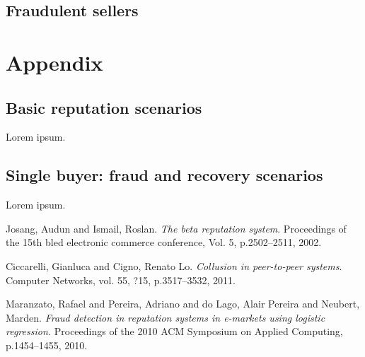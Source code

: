 \documentclass[11pt]{article}
\begin{document}
\subsection{Fraudulent sellers}

\section{Appendix} \label{appendix}

\subsection{Basic reputation scenarios} \label{appendix:basicReputation}

Lorem ipsum.

\subsection{Single buyer: fraud and recovery scenarios} \label{appendix:fraudAndRecovery}

Lorem ipsum.


\newpage

\begin{thebibliography}{1}
 
Josang, Audun and Ismail, Roslan. 
\textit{The beta reputation system}.
Proceedings of the 15th bled electronic commerce conference, Vol. 5, p.2502--2511, 2002.

Ciccarelli, Gianluca and Cigno, Renato Lo.
\textit{Collusion in peer-to-peer systems}.
Computer Networks, vol. 55, ?15, p.3517--3532, 2011.

Maranzato, Rafael and Pereira, Adriano and do Lago, Alair Pereira and Neubert, Marden.
\textit{Fraud detection in reputation systems in e-markets using logistic regression.}
Proceedings of the 2010 ACM Symposium on Applied Computing, p.1454--1455, 2010.

\end{thebibliography}
\end{document}
